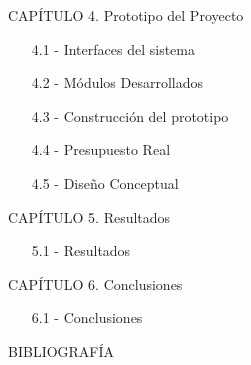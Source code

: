 \vspace{1em}
CAPÍTULO 4. Prototipo del Proyecto
\begin{enumerate}
  \item[4.1 -] Interfaces del sistema
  \item[4.2 -] Módulos Desarrollados
  \item[4.3 -] Construcción del prototipo
  \item[4.4 -] Presupuesto Real
  \item[4.5 -] Diseño Conceptual
\end{enumerate}

\vspace{1em}
CAPÍTULO 5. Resultados
\begin{enumerate}
  \item[5.1 -] Resultados
\end{enumerate}

\vspace{1em}
CAPÍTULO 6. Conclusiones
\begin{enumerate}
  \item[6.1 -] Conclusiones
\end{enumerate}

\vspace{1em}
BIBLIOGRAFÍA
